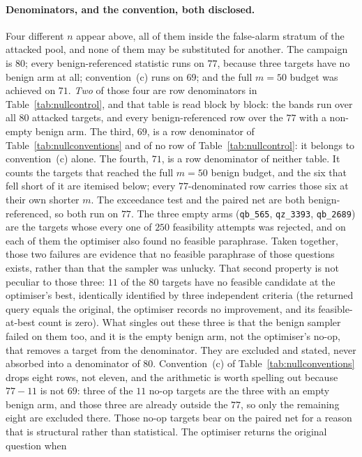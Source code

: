 \paragraph{Denominators, and the convention, both disclosed.}
Four different $n$ appear above, all of them inside the false-alarm stratum of the attacked
pool, and none of them may be substituted for another. The campaign
is $80$; every benign-referenced statistic runs
on $77$, because three targets have no benign arm at all; convention~(c) runs on $69$; and the
full $m{=}50$ budget was achieved on $71$. \emph{Two} of those four are row denominators in
Table~\ref{tab:nullcontrol}, and that table is read block by block: the bands run over all
$80$ attacked targets, and every benign-referenced row over the $77$ with a non-empty
benign arm. The third, $69$, is a row denominator of
Table~\ref{tab:nullconventions} and of no row of Table~\ref{tab:nullcontrol}: it belongs to
convention~(c) alone. The fourth, $71$, is a row denominator of neither table. It counts the
targets that reached the full $m{=}50$ benign budget, and the six that fell short of it are
itemised below; every $77$-denominated row carries those six at their own shorter $m$.
The exceedance test and the paired net are both
benign-referenced, so both run on $77$. The three empty arms
(\texttt{qb\_565}, \texttt{qz\_3393}, \texttt{qb\_2689}) are the targets whose every one of
$250$ feasibility attempts was rejected, and on each of them the optimiser also found no
feasible paraphrase. Taken together, those two failures are evidence that no feasible
paraphrase of those
questions exists, rather than that the sampler was unlucky. That second property is not
peculiar to those three: $11$ of the $80$ targets have no feasible candidate at the
optimiser's best, identically identified by three independent criteria (the returned query
equals the original, the optimiser records no improvement, and its feasible-at-best count is
zero). What singles out these three is that the benign sampler failed on them too, and it is
the empty benign arm, not the optimiser's no-op, that removes a target from the denominator.
They are excluded and stated, never absorbed into a denominator of $80$.
Convention~(c) of Table~\ref{tab:nullconventions} drops eight rows, not eleven, and the
arithmetic is worth spelling out because $77{-}11$ is not $69$: three of the $11$ no-op targets
are the three with an empty benign arm, and those three are already outside the $77$, so only
the remaining eight are excluded there. Those no-op targets bear on the paired net for a reason
that is structural rather than statistical. The optimiser returns the original question when
